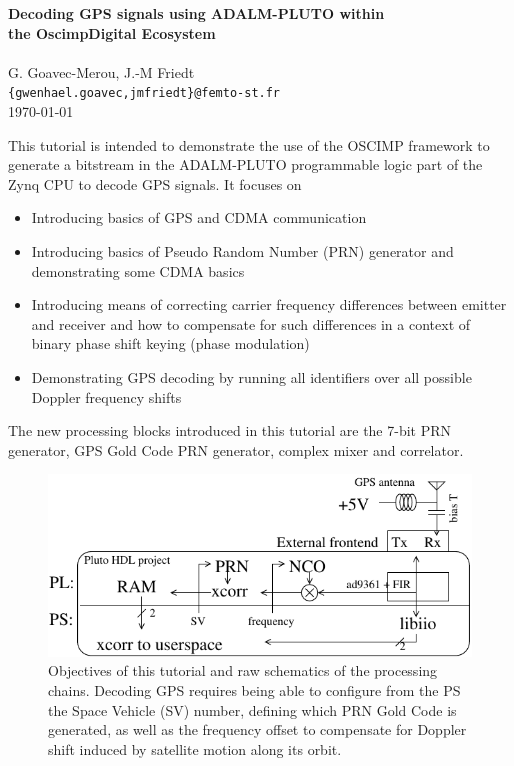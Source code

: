 \documentclass{article}
\begin{document}
\begin{center}
{\bf \Large Decoding GPS signals using ADALM-PLUTO within \\ the OscimpDigital Ecosystem} \\ \ \\
G. Goavec-Merou, J.-M Friedt \\ {\tt \{gwenhael.goavec,jmfriedt\}@femto-st.fr}\ \\ \today
\end{center}

This tutorial is intended to demonstrate the use of the OSCIMP framework to generate
a bitstream in the ADALM-PLUTO programmable logic part of the Zynq CPU to decode GPS \cite{collins} signals.
It focuses on

\begin{itemize}
	\item Introducing basics of GPS and CDMA communication
	\item Introducing basics of Pseudo Random Number (PRN) generator and demonstrating some CDMA basics
	\item Introducing means of correcting carrier frequency differences between emitter and receiver and how to compensate
for such differences in a context of binary phase shift keying (phase modulation)
	\item Demonstrating GPS decoding by running all identifiers over all possible Doppler frequency shifts
\end{itemize}

The new processing blocks introduced in this tutorial are the 7-bit PRN generator, GPS Gold Code 
PRN generator, complex mixer and correlator.

\begin{figure}[h!]
\begin{center}
\includegraphics[width=.7\linewidth]{pluto-oscimpDigital-objective}
\end{center}
\caption{Objectives of this tutorial and raw schematics of the
processing chains. Decoding GPS requires being able to configure from the PS the Space Vehicle (SV)
number, defining which PRN Gold Code is generated, as well as the frequency offset to compensate for 
Doppler shift induced by satellite motion along its orbit.}
\end{figure}
\end{document}
